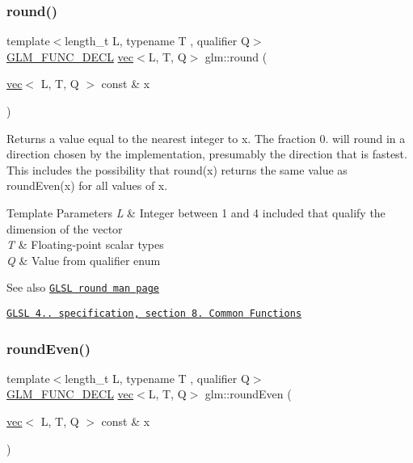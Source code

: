 \subsubsection{\texorpdfstring{round()}{round()}}
{\footnotesize\ttfamily template$<$length\+\_\+t L, typename T , qualifier Q$>$ \\
\hyperlink{setup_8hpp_ab2d052de21a70539923e9bcbf6e83a51}{G\+L\+M\+\_\+\+F\+U\+N\+C\+\_\+\+D\+E\+CL} \hyperlink{structglm_1_1vec}{vec}$<$L, T, Q$>$ glm\+::round (\begin{DoxyParamCaption}\item[{\hyperlink{structglm_1_1vec}{vec}$<$ L, T, Q $>$ const \&}]{x }\end{DoxyParamCaption})}

Returns a value equal to the nearest integer to x. The fraction 0. will round in a direction chosen by the implementation, presumably the direction that is fastest. This includes the possibility that round(x) returns the same value as round\+Even(x) for all values of x.


\begin{DoxyTemplParams}{Template Parameters}
{\em L} & Integer between 1 and 4 included that qualify the dimension of the vector \\
\hline
{\em T} & Floating-\/point scalar types \\
\hline
{\em Q} & Value from qualifier enum\\
\hline
\end{DoxyTemplParams}
\begin{DoxySeeAlso}{See also}
\href{http://www.opengl.org/sdk/docs/manglsl/xhtml/round.xml}{\tt G\+L\+SL round man page} 

\href{http://www.opengl.org/registry/doc/GLSLangSpec.4.20.8.pdf}{\tt G\+L\+SL 4.. specification, section 8. Common Functions} 
\end{DoxySeeAlso}
\mbox{\label{group__core__func__common_ga76b81785045a057989a84d99aeeb1578}} 
\subsubsection{\texorpdfstring{round\+Even()}{roundEven()}}
{\footnotesize\ttfamily template$<$length\+\_\+t L, typename T , qualifier Q$>$ \\
\hyperlink{setup_8hpp_ab2d052de21a70539923e9bcbf6e83a51}{G\+L\+M\+\_\+\+F\+U\+N\+C\+\_\+\+D\+E\+CL} \hyperlink{structglm_1_1vec}{vec}$<$L, T, Q$>$ glm\+::round\+Even (\begin{DoxyParamCaption}\item[{\hyperlink{structglm_1_1vec}{vec}$<$ L, T, Q $>$ const \&}]{x }\end{DoxyParamCaption})}

